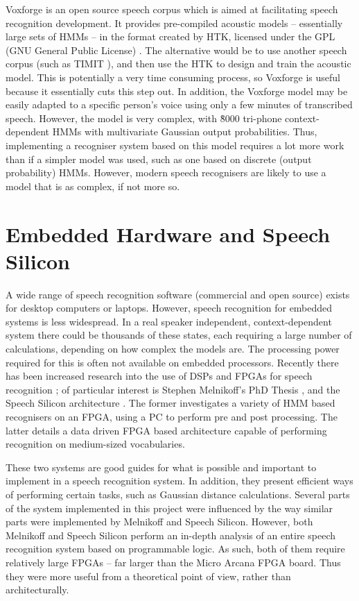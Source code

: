 	Voxforge is an open source speech corpus which is aimed at facilitating speech recognition development.  It provides pre-compiled acoustic models -- essentially large sets of HMMs -- in the format created by HTK, licensed under the GPL (GNU General Public License) \cite{voxforge}.  The alternative would be to use another speech corpus (such as TIMIT \cite{timit}), and then use the HTK to design and train the acoustic model.  This is potentially a very time consuming process, so Voxforge is useful because it essentially cuts this step out.  In addition, the Voxforge model may be easily adapted to a specific person's voice using only a few minutes of transcribed speech.  However, the model is very complex, with \~8000 tri-phone context-dependent HMMs with multivariate Gaussian output probabilities.  Thus, implementing a recogniser system based on this model requires a lot more work than if a simpler model was used, such as one based on discrete (output probability) HMMs.  However, modern speech recognisers are likely to use a model that is as complex, if not more so.


\section{Embedded Hardware and Speech Silicon} %
\label{sec:embedded_hardware}
	A wide range of speech recognition software (commercial and open source) exists for desktop computers or laptops.  However, speech recognition for embedded systems is less widespread.  In a real speaker independent, context-dependent system there could be thousands of these states, each requiring a large number of calculations, depending on how complex the models are.  The processing power required for this is often not available on embedded processors.  Recently there has been increased research into the use of DSPs and FPGAs for speech recognition \cite{nedevschi2005hardware}; of particular interest is Stephen Melnikoff's PhD Thesis \cite{melnikoff2003speech}, and the Speech Silicon architecture \cite{schuster2006speech}.  The former investigates a variety of HMM based recognisers on an FPGA, using a PC to perform pre and post processing.  The latter details a data driven FPGA based architecture capable of performing recognition on medium-sized vocabularies.

	These two systems are good guides for what is possible and important to implement in a speech recognition system.  In addition, they present efficient ways of performing certain tasks, such as Gaussian distance calculations.  Several parts of the system implemented in this project were influenced by the way similar parts were implemented by Melnikoff and Speech Silicon.  However, both Melnikoff and Speech Silicon perform an in-depth analysis of an entire speech recognition system based on programmable logic.  As such, both of them require relatively large FPGAs -- far larger than the Micro Arcana FPGA board.  Thus they were more useful from a theoretical point of view, rather than architecturally.


